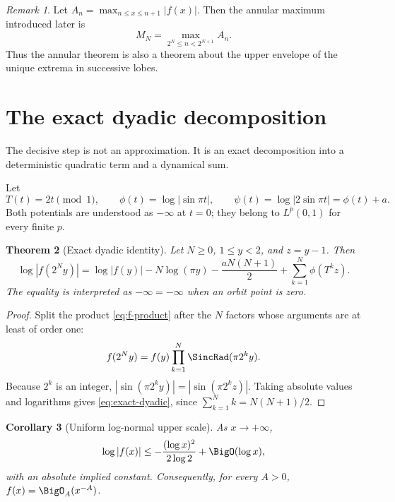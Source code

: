 \documentclass[11pt,oneside]{article}
\newtheorem{theorem}{Theorem}[section]
\newtheorem{corollary}[theorem]{Corollary}
\theoremstyle{definition}
\theoremstyle{remark}
\newtheorem{remark}[theorem]{Remark}
\newcommand{\T}{T}
\begin{document}
\begin{remark}
Let $A_n=\max_{n\le x\le n+1}|f(x)|$.  Then the annular maximum introduced
later is
\[
 M_N=\max_{2^N\le n<2^{N+1}}A_n.
\]
Thus the annular theorem is also a theorem about the upper envelope of the
unique extrema in successive lobes.
\end{remark}

\section{The exact dyadic decomposition}

The decisive step is not an approximation.  It is an exact decomposition into
a deterministic quadratic term and a dynamical sum.

Let
\begin{equation}
 \T(t)=2t\pmod1,
 \qquad
 \phi(t)=\log|\sin\pi t|,
 \qquad
 \psi(t)=\log|2\sin\pi t|=\phi(t)+a.                       \label{eq:potentials}
\end{equation}
Both potentials are understood as $-\infty$ at $t=0$; they belong to $L^p(0,1)$
for every finite $p$.

\begin{theorem}[Exact dyadic identity]
Let $N\ge0$, $1\le y<2$, and $z=y-1$.  Then
\begin{equation}
 \boxed{\quad
 \log|f(2^Ny)|
 =\log|f(y)|-N\log(\pi y)-\frac{aN(N+1)}2
  +\sum_{k=1}^{N}\phi(\T^kz).
 \quad}                                                     \label{eq:exact-dyadic}
\end{equation}
The equality is interpreted as $-\infty=-\infty$ when an orbit point is zero.
\end{theorem}

\begin{proof}
Split the product \eqref{eq:f-product} after the $N$ factors whose arguments
are at least of order one:
\[
 f(2^Ny)=f(y)\prod_{k=1}^{N}\SincRad(\pi2^ky).
\]
Because $2^k$ is an integer,
$|\sin(\pi2^ky)|=|\sin(\pi2^kz)|$.  Taking absolute values and logarithms gives
\eqref{eq:exact-dyadic}, since $\sum_{k=1}^{N}k=N(N+1)/2$.
\end{proof}

\begin{corollary}[Uniform log-normal upper scale]
As $x\to+\infty$,
\begin{equation}
 \log|f(x)|\le-\frac{(\log x)^2}{2\log2}+\BigO(\log x),     \label{eq:universal-upper}
\end{equation}
with an absolute implied constant.  Consequently, for every $A>0$,
$f(x)=\BigO_A(x^{-A})$.
\end{corollary}
\end{document}
